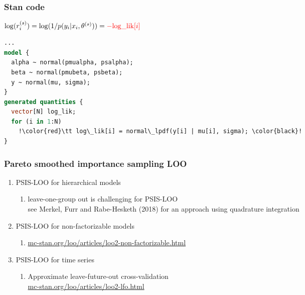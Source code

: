 \documentclass[10pt]{beamer}
\begin{document}
\begin{frame}[fragile]

\frametitle{Stan code }

  \vspace{\baselineskip}
  $ \log(r_i^{(s)}) = \log(1/p(y_i|x_i,\theta^{(s)})) = {\color{red}-\mbox{log\_lik}[i]}$
  \vspace{\baselineskip}

  \pause
  {\small
\begin{lstlisting}[language=Stan,escapechar=!]
...
model {
  alpha ~ normal(pmualpha, psalpha);
  beta ~ normal(pmubeta, psbeta);
  y ~ normal(mu, sigma);
}
generated quantities {
  vector[N] log_lik;
  for (i in 1:N)
    !\color{red}\tt log\_lik[i] = normal\_lpdf(y[i] | mu[i], sigma); \color{black}!
}
\end{lstlisting}
  }

\end{frame}

\begin{frame}{}

\frametitle{ Pareto smoothed importance sampling LOO}

\begin{enumerate}
\item PSIS-LOO for hierarchical models
  \begin{enumerate}
  \item leave-one-group out is challenging for PSIS-LOO\\ \vspace{0.2\baselineskip}
    {\small see Merkel, Furr and Rabe-Hesketh
      (2018) for an approach using quadrature integration}
  \end{enumerate}
  \item<2-> PSIS-LOO for non-factorizable models
    \begin{enumerate}
    \item {\url{mc-stan.org/loo/articles/loo2-non-factorizable.html}}
    \end{enumerate}
  \item<3-> PSIS-LOO for time series
  \begin{enumerate}
  \item Approximate leave-future-out cross-validation \\ \vspace{0.2\baselineskip}
    {\url{mc-stan.org/loo/articles/loo2-lfo.html}}
  \end{enumerate}
\end{enumerate}

\end{frame}
\end{document}
